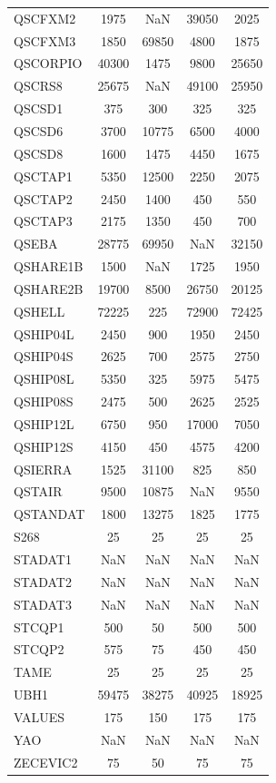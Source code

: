 \begin{longtable}{lcccc}
QSCFXM2  &     1975 &   NaN &    39050 &     2025 \\
QSCFXM3  &     1850 & 69850 &     4800 &     1875 \\
QSCORPIO &    40300 &  1475 &     9800 &    25650 \\
QSCRS8   &    25675 &   NaN &    49100 &    25950 \\
QSCSD1   &      375 &   300 &      325 &      325 \\
QSCSD6   &     3700 & 10775 &     6500 &     4000 \\
QSCSD8   &     1600 &  1475 &     4450 &     1675 \\
QSCTAP1  &     5350 & 12500 &     2250 &     2075 \\
QSCTAP2  &     2450 &  1400 &      450 &      550 \\
QSCTAP3  &     2175 &  1350 &      450 &      700 \\
QSEBA    &    28775 & 69950 &      NaN &    32150 \\
QSHARE1B &     1500 &   NaN &     1725 &     1950 \\
QSHARE2B &    19700 &  8500 &    26750 &    20125 \\
QSHELL   &    72225 &   225 &    72900 &    72425 \\
QSHIP04L &     2450 &   900 &     1950 &     2450 \\
QSHIP04S &     2625 &   700 &     2575 &     2750 \\
QSHIP08L &     5350 &   325 &     5975 &     5475 \\
QSHIP08S &     2475 &   500 &     2625 &     2525 \\
QSHIP12L &     6750 &   950 &    17000 &     7050 \\
QSHIP12S &     4150 &   450 &     4575 &     4200 \\
QSIERRA  &     1525 & 31100 &      825 &      850 \\
QSTAIR   &     9500 & 10875 &      NaN &     9550 \\
QSTANDAT &     1800 & 13275 &     1825 &     1775 \\
S268     &       25 &    25 &       25 &       25 \\
STADAT1  &      NaN &   NaN &      NaN &      NaN \\
STADAT2  &      NaN &   NaN &      NaN &      NaN \\
STADAT3  &      NaN &   NaN &      NaN &      NaN \\
STCQP1   &      500 &    50 &      500 &      500 \\
STCQP2   &      575 &    75 &      450 &      450 \\
TAME     &       25 &    25 &       25 &       25 \\
UBH1     &    59475 & 38275 &    40925 &    18925 \\
VALUES   &      175 &   150 &      175 &      175 \\
YAO      &      NaN &   NaN &      NaN &      NaN \\
ZECEVIC2 &       75 &    50 &       75 &       75 \\
\end{longtable}
